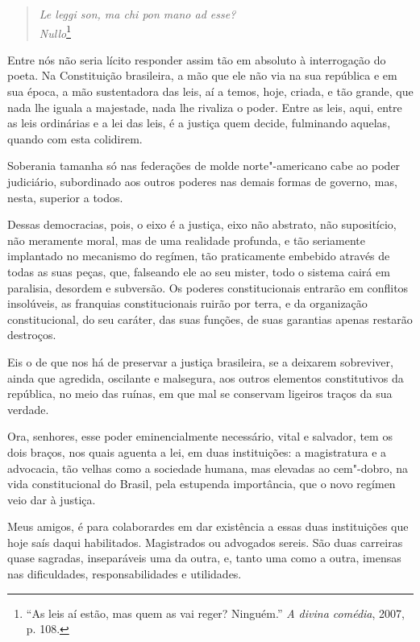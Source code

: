 
\begin{verse}
\textit{Le leggi son, ma chi pon mano ad esse?}\\
\textit{Nullo}\footnote{ ``As leis aí estão, mas quem as vai reger?
Ninguém.'' \textit{A divina comédia}, 2007, p. 108.} 
\end{verse}

Entre nós não seria lícito responder assim tão em absoluto à
interrogação do poeta. Na Constituição brasileira, a mão que ele não
via na sua república e em sua época, a mão sustentadora das leis, aí a
temos, hoje, criada, e tão grande, que nada lhe iguala a majestade,
nada lhe rivaliza o poder. Entre as leis, aqui, entre as leis
ordinárias e a lei das leis, é a justiça quem decide, fulminando
aquelas, quando com esta colidirem.

Soberania tamanha só nas federações de molde norte"-americano cabe
ao poder judiciário, subordinado aos outros poderes nas demais formas
de governo, mas, nesta, superior a todos.

Dessas democracias, pois, o eixo é a justiça, eixo não abstrato,
não supositício, não meramente moral, mas de uma realidade profunda, e
tão seriamente implantado no mecanismo do regímen, tão praticamente
embebido através de todas as suas peças, que, falseando ele ao seu
mister, todo o sistema cairá em paralisia, desordem e subversão. Os
poderes constitucionais entrarão em conflitos insolúveis, as franquias
constitucionais ruirão por terra, e da organização constitucional, do
seu caráter, das suas funções, de suas garantias apenas restarão destroços.

Eis o de que nos há de preservar a justiça brasileira, se a
deixarem sobreviver, ainda que agredida, oscilante e malsegura, aos
outros elementos constitutivos da república, no meio das ruínas, em que
mal se conservam ligeiros traços da sua verdade.

Ora, senhores, esse poder eminencialmente necessário, vital e
salvador, tem os dois braços, nos quais aguenta a lei, em duas
instituições: a magistratura e a advocacia, tão velhas como a sociedade
humana, mas elevadas ao cem"-dobro, na vida constitucional do Brasil,
pela estupenda importância, que o novo regímen veio dar à justiça.

Meus amigos, é para colaborardes em dar existência a essas duas
instituições que hoje saís daqui habilitados. Magistrados ou advogados
sereis. São duas carreiras quase sagradas, inseparáveis uma da outra,
e, tanto uma como a outra, imensas nas dificuldades, responsabilidades
e utilidades.

